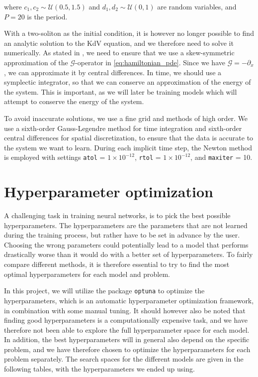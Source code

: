 where \(c_1, c_2 \sim \mathcal{U}(0.5, 1.5)\) and \(d_1, d_2 \sim \mathcal{U}(0, 1)\) are random variables, and \(P=20\) is the period.

With a two-soliton as the initial condition, it is however no longer possible to find an analytic solution to the KdV equation, and we therefore need to solve it numerically.
As stated in , we need to ensure that we use a skew-symmetric approximation of the \(\mathcal{G}\)-operator in \cref{eq:hamiltonian_pde}. Since we have \(\mathcal{G}=-\partial_x\), we can approximate it by central differences.
In time, we should use a symplectic integrator, so that we can conserve an approximation of the energy of the system. This is important, as we will later be training models which will attempt to conserve the energy of the system.

To avoid inaccurate solutions, we use a fine grid and methods of high order. We use a sixth-order Gauss-Legendre method for time integration and sixth-order central differences for spatial discretization, to ensure that the data is accurate to the system we want to learn. During each implicit time step, the Newton method is employed with settings \texttt{atol} = $1 \times 10^{-12}$, \texttt{rtol} = $1 \times 10^{-12}$, and \texttt{maxiter} = 10.

\section{Hyperparameter optimization}

A challenging task in training neural networks, is to pick the best possible hyperparameters. The hyperparameters are the parameters that are not learned during the training process, but rather have to be set in advance by the user.
Choosing the wrong parameters could potentially lead to a model that performs drastically worse than it would do with a better set of hyperparameters. To fairly compare different methods, it is therefore essential to try to find the most optimal hyperparameters for each model and problem.

In this project, we will utilize the package \texttt{optuna} to optimize the hyperparameters, which is an automatic hyperparameter optimization framework, in combination with some manual tuning. 
It should however also be noted that finding good hyperparameters is a computationally expensive task, and we have therefore not been able to explore the full hyperparameter space for each model.
In addition, the best hyperparameters will in general also depend on the specific problem, and we have therefore chosen to optimize the hyperparameters for each problem separately.
The search spaces for the different models are given in the following tables, with the hyperparameters we ended up using.

